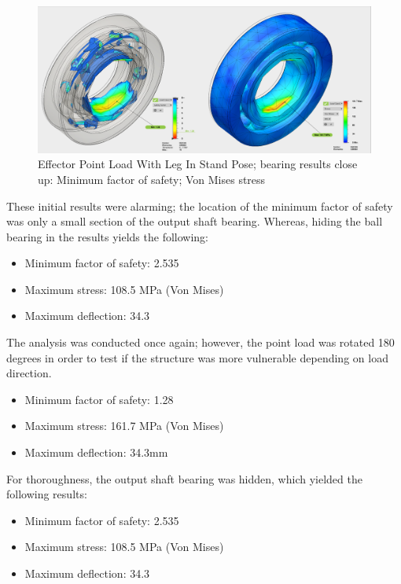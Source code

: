 \begin{figure}
\centering
\includegraphics[width=1.0\columnwidth]{./img/aquaShoko-v3dot3-FEA-bearingOnly.png}
\caption{Effector Point Load With Leg In Stand Pose; bearing results close up: Minimum factor of safety; Von Mises stress}
\label{fig:FEA EE bearing only}
\end{figure}







These initial results were alarming; the location of the minimum factor of safety was only a small section of the output shaft bearing. Whereas, hiding the ball bearing in the results yields the following:
  \begin{itemize}
     \item Minimum factor of safety: 2.535
     \item Maximum stress: 108.5 MPa (Von Mises)
     \item Maximum deflection: 34.3
 \end{itemize}



The analysis was conducted once again; however, the point load was rotated 180 degrees in order to test if the structure was more vulnerable depending on load direction.
 \begin{itemize}
     \item Minimum factor of safety: 1.28
     \item Maximum stress: 161.7 MPa (Von Mises)
     \item Maximum deflection: 34.3mm
 \end{itemize}
 
For thoroughness, the output shaft bearing was hidden, which yielded the following results:
  \begin{itemize}
     \item Minimum factor of safety: 2.535
     \item Maximum stress: 108.5 MPa (Von Mises)
     \item Maximum deflection: 34.3
 \end{itemize}
 
